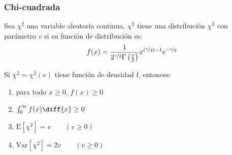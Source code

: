\subsubsection{Chi-cuadrada}
\begin{Def}
    Sea $\chi^2$ una variable aleatoria continua, $\chi^2$ tiene una
    distribución $\chi^2$ con parámetro $v$ si su función de distribución
    es:
    \[
        f(x) = \frac{1}{2^{\nicefrac{v}{2}}\Gamma\left(\frac{v}{2}\right)}
        x^{\left(\nicefrac{v}{2}\right)-1}e^{\nicefrac{-x}{2}}
    \]  
\end{Def}

\begin{Teo}
    Si $\chi^2 \sim \chi^2(v)$ tiene función de densidad f, entonces:
    \begin{enumerate}
        \item para todo $x\geq0$, $f(x)\geq0$
        \item $\int_{0}^{\infty}f(x)\diff{x}\geq0$
        \item $\text{E}[\chi^2]= v \qquad(v\geq0)$
        \item $\text{Var}[\chi^2]= 2v \qquad(v\geq0)$
    \end{enumerate}
\end{Teo}

